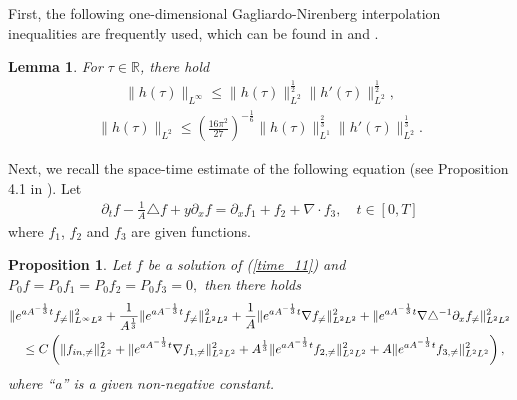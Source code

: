 \documentclass[12pt, reqno]{amsart}
\newtheorem{proposition}{Proposition}[section]
\newtheorem{lemma}{Lemma}[section]
\newcommand{\ben}{\begin{eqnarray}}
\newcommand{\een}{\end{eqnarray}}
\numberwithin{equation}{section}
\begin{document}
	First, the following one-dimensional Gagliardo-Nirenberg interpolation inequalities are frequently used, which can be found in \cite{Na1} and \cite{LW1}.
	\begin{lemma} For $\tau\in \mathbb{R}$, there hold
		\ben\label{eq:1DGN-1}
		\|h(\tau)\|_{L^{\infty}}\leq \|h(\tau)\|_{L^{2}}^{\frac12}\|h'(\tau)\|_{L^{2}}^{\frac12},
		\een
		\ben\label{eq:1DGN-2}
		\|h(\tau)\|_{L^{2}}\leq  \left(\frac{16\pi^2}{27}\right)^{-\frac{1}{6}}\|h(\tau)\|_{L^{1}}^{\frac23}\|h'(\tau)\|_{L^{2}}^{\frac13}.
		\een
	\end{lemma}
	
	
	Next, we recall the space-time estimate of the following equation (see Proposition 4.1 in \cite{wei2}).
	Let
	\begin{equation}\label{time_11}
		\begin{aligned}
			\partial_t f-\frac{1}{A}\triangle f+y\partial_xf=\partial_xf_{1}+f_{2}
			+\nabla\cdot f_{3},\quad t\in[0,T]
		\end{aligned}
	\end{equation}
	where  $f_{1}$, $f_{2}$ and $f_{3}$ are given functions.
	\begin{proposition}\label{timespace0}
		Let $f$	be a solution of (\ref{time_11}) and $ P_{0}f=P_{0}f_{1}=P_{0}f_{2}=P_{0}f_{3}=0, $ then there holds
		\begin{equation*}
			\begin{aligned}
				&\|{\rm e}^{aA^{-\frac{1}{3}}t}f_{\neq}\|^2_{L^{\infty}L^{2}}
				+\frac{1}{A^{\frac{1}{3}}}\|{\rm e}^{aA^{-\frac{1}{3}}t} f_{\neq}\|^2_{L^{2}L^{2}}
				+\frac{1}{A}\|{\rm e}^{aA^{-\frac{1}{3}}t}\nabla f_{\neq}\|^2_{L^{2}L^{2}}
				+\|{\rm e}^{aA^{-\frac13}t}\nabla\triangle^{-1}\partial_{x}f_{\neq}\|_{L^{2}L^{2}}^{2} \\
				&\quad \leq C\left(\|f_{\rm in,\neq}\|_{L^2}^2
				+\|{\rm e}^{aA^{-\frac{1}{3}}t}\nabla f_{1,\neq}\|_{L^2L^2}^2
				+A^{\frac{1}{3}}\|{\rm e}^{aA^{-\frac{1}{3}}t}f_{2,\neq}\|_{L^2L^2}^2 +A\|{\rm e}^{aA^{-\frac{1}{3}}t}f_{3,\neq}\|_{L^2L^2}^2\right),
			\end{aligned}
		\end{equation*}
		where ``a'' is a given non-negative constant.
	\end{proposition}
	
	
	
	
	
\end{document}
